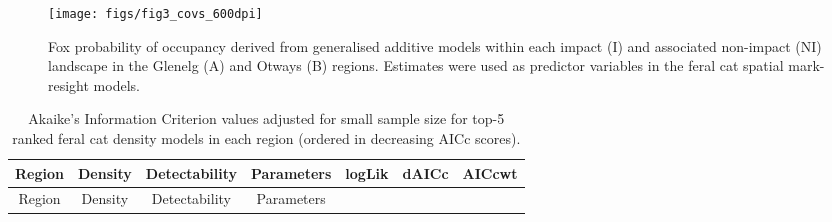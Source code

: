 \documentclass[]{elsarticle} %
\begin{document}
\begin{figure}
\texttt{[image: figs/fig3\_covs\_600dpi]} \caption{Fox probability of occupancy derived from generalised additive models within each impact (I) and associated non-impact (NI) landscape in the Glenelg (A) and Otways (B) regions. Estimates were used as predictor variables in the feral cat spatial mark-resight models.}\label{fig:foxplot}
\end{figure}

\newpage

\begin{longtable}[]{@{}ccccccc@{}}
\caption{\label{tab:aictab} Akaike's Information Criterion values adjusted for small sample size for top-5 ranked feral cat density models in each region (ordered in decreasing AICc scores).}\tabularnewline
\toprule
\begin{minipage}[b]{0.09\columnwidth}\centering
Region\strut
\end{minipage} & \begin{minipage}[b]{0.20\columnwidth}\centering
Density\strut
\end{minipage} & \begin{minipage}[b]{0.15\columnwidth}\centering
Detectability\strut
\end{minipage} & \begin{minipage}[b]{0.12\columnwidth}\centering
Parameters\strut
\end{minipage} & \begin{minipage}[b]{0.08\columnwidth}\centering
logLik\strut
\end{minipage} & \begin{minipage}[b]{0.07\columnwidth}\centering
dAICc\strut
\end{minipage} & \begin{minipage}[b]{0.08\columnwidth}\centering
AICcwt\strut
\end{minipage}\tabularnewline
\midrule
\endfirsthead
\toprule
\begin{minipage}[b]{0.09\columnwidth}\centering
Region\strut
\end{minipage} & \begin{minipage}[b]{0.20\columnwidth}\centering
Density\strut
\end{minipage} & \begin{minipage}[b]{0.15\columnwidth}\centering
Detectability\strut
\end{minipage} & \begin{minipage}[b]{0.12\columnwidth}\centering
Parameters\strut
\end{minipage} & \begin{minipage}[b]{0.08\columnwidth}\centering

\end{minipage}
\end{longtable}
\end{document}
